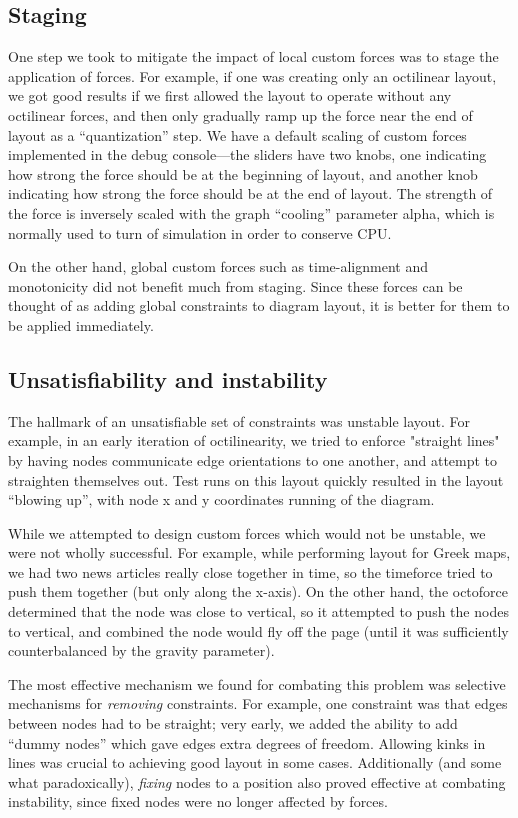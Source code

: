 \documentclass{chi2009}
\begin{document}
\subsection{Staging}

One step we took to mitigate the impact of local custom forces was to stage
the application of forces.  For example, if one was creating only an octilinear
layout, we got good results if we first allowed the layout to operate without
any octilinear forces, and then only gradually ramp up the force near the end of
layout as a ``quantization'' step.  We have a default scaling of custom forces
implemented in the debug console---the sliders have two knobs, one indicating
how strong the force should be at the beginning of layout, and another knob indicating
how strong the force should be at the end of layout.  The strength of the force is
inversely scaled with the graph ``cooling'' parameter alpha, which is normally
used to turn of simulation in order to conserve CPU.

On the other hand, global custom forces such as time-alignment and monotonicity
did not benefit much from staging.  Since these forces can be thought of as adding
global constraints to diagram layout, it is better for them to be applied immediately.

\subsection{Unsatisfiability and instability}

The hallmark of an unsatisfiable set of constraints was unstable layout.
For example, in an early iteration of octilinearity, we tried to enforce
"straight lines" by having nodes communicate edge orientations to one another,
and attempt to straighten themselves out.  Test runs on this layout quickly
resulted in the layout ``blowing up'', with node x and y coordinates running
of the diagram.

While we attempted to design custom forces which would not be unstable,
we were not wholly successful.  For example, while performing layout for
Greek maps, we had two news articles really close together in time, so
the timeforce tried to push them together (but only along the x-axis).
On the other hand, the octoforce determined that the node was close to
vertical, so it attempted to push the nodes to vertical, and combined
the node would fly off the page (until it was sufficiently counterbalanced
by the gravity parameter).

The most effective mechanism we found for combating this problem was
selective mechanisms for \emph{removing} constraints.  For example, one
constraint was that edges between nodes had to be straight; very early,
we added the ability to add ``dummy nodes'' which gave edges extra
degrees of freedom.  Allowing kinks in lines was crucial to achieving
good layout in some cases.  Additionally (and some what paradoxically),
\emph{fixing} nodes to a position also proved effective at combating
instability, since fixed nodes were no longer affected by forces.
\end{document}
